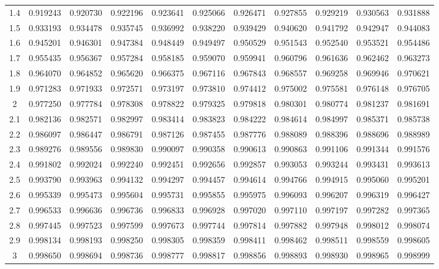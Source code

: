 \documentclass[
]{book}
\theoremstyle{definition}
\theoremstyle{definition}
\theoremstyle{definition}
\theoremstyle{definition}
\theoremstyle{remark}
\begin{document}
\begin{longtable}[]{@{}ccccccccccc@{}}
1.4 & 0.919243 & 0.920730 & 0.922196 & 0.923641 & 0.925066 & 0.926471 & 0.927855 & 0.929219 & 0.930563 & 0.931888 \\
1.5 & 0.933193 & 0.934478 & 0.935745 & 0.936992 & 0.938220 & 0.939429 & 0.940620 & 0.941792 & 0.942947 & 0.944083 \\
1.6 & 0.945201 & 0.946301 & 0.947384 & 0.948449 & 0.949497 & 0.950529 & 0.951543 & 0.952540 & 0.953521 & 0.954486 \\
1.7 & 0.955435 & 0.956367 & 0.957284 & 0.958185 & 0.959070 & 0.959941 & 0.960796 & 0.961636 & 0.962462 & 0.963273 \\
1.8 & 0.964070 & 0.964852 & 0.965620 & 0.966375 & 0.967116 & 0.967843 & 0.968557 & 0.969258 & 0.969946 & 0.970621 \\
1.9 & 0.971283 & 0.971933 & 0.972571 & 0.973197 & 0.973810 & 0.974412 & 0.975002 & 0.975581 & 0.976148 & 0.976705 \\
2 & 0.977250 & 0.977784 & 0.978308 & 0.978822 & 0.979325 & 0.979818 & 0.980301 & 0.980774 & 0.981237 & 0.981691 \\
2.1 & 0.982136 & 0.982571 & 0.982997 & 0.983414 & 0.983823 & 0.984222 & 0.984614 & 0.984997 & 0.985371 & 0.985738 \\
2.2 & 0.986097 & 0.986447 & 0.986791 & 0.987126 & 0.987455 & 0.987776 & 0.988089 & 0.988396 & 0.988696 & 0.988989 \\
2.3 & 0.989276 & 0.989556 & 0.989830 & 0.990097 & 0.990358 & 0.990613 & 0.990863 & 0.991106 & 0.991344 & 0.991576 \\
2.4 & 0.991802 & 0.992024 & 0.992240 & 0.992451 & 0.992656 & 0.992857 & 0.993053 & 0.993244 & 0.993431 & 0.993613 \\
2.5 & 0.993790 & 0.993963 & 0.994132 & 0.994297 & 0.994457 & 0.994614 & 0.994766 & 0.994915 & 0.995060 & 0.995201 \\
2.6 & 0.995339 & 0.995473 & 0.995604 & 0.995731 & 0.995855 & 0.995975 & 0.996093 & 0.996207 & 0.996319 & 0.996427 \\
2.7 & 0.996533 & 0.996636 & 0.996736 & 0.996833 & 0.996928 & 0.997020 & 0.997110 & 0.997197 & 0.997282 & 0.997365 \\
2.8 & 0.997445 & 0.997523 & 0.997599 & 0.997673 & 0.997744 & 0.997814 & 0.997882 & 0.997948 & 0.998012 & 0.998074 \\
2.9 & 0.998134 & 0.998193 & 0.998250 & 0.998305 & 0.998359 & 0.998411 & 0.998462 & 0.998511 & 0.998559 & 0.998605 \\
3 & 0.998650 & 0.998694 & 0.998736 & 0.998777 & 0.998817 & 0.998856 & 0.998893 & 0.998930 & 0.998965 & 0.998999 \\

\end{longtable}
\end{document}
